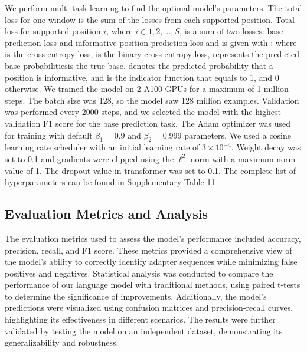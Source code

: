 \documentclass[pdflatex, sn-mathphys-num, lineno]{sn-jnl}%
\theoremstyle{thmstyleone}%
\theoremstyle{thmstyletwo}%
\theoremstyle{thmstylethree}%
\begin{document}
We perform multi-task learning to find the optimal model’s parameters.
The total loss for one window is the sum of the losses from each supported position.
Total loss for supported position  \( i \), where \( i  \in {1,2, \ldots, S} \), is a sum of two losses: base prediction loss and informative position prediction loss and is given with :
where is the cross-entropy loss,  is the binary cross-entropy loss, represents the predicted base probabilitiesis the true base.
denotes the predicted probability that a
position is informative, and is the indicator function that equals to 1, and 0 otherwise.
We trained the model on 2 A100 GPUs for a maximum of 1 million steps.
The batch size was 128, so the model saw 128 million examples.
Validation was performed every 2000 steps, and we selected the model with the highest validation F1 score for the base prediction task.
The Adam optimizer was used for training with default \( \beta_{1} = 0.9 \) and \( \beta_{2} = 0.999 \) parameters.
We used a cosine learning rate scheduler with an initial learning rate of \( 3 \times 10^{-4} \).
Weight decay was set to 0.1 and gradients were clipped using the \( \ell^{2}\)-norm with a maximum norm value of 1.
The dropout value in transformer was set to \num{0.1}.
The complete list of hyperparameters can be found in Supplementary Table 11

\subsection{Evaluation Metrics and Analysis}

The evaluation metrics used to assess the model's performance included accuracy, precision, recall, and F1 score.
These metrics provided a comprehensive view of the model's ability to correctly identify adapter sequences while minimizing false positives and negatives.
Statistical analysis was conducted to compare the performance of our language model with traditional methods, using paired t-tests to determine the significance of improvements.
Additionally, the model's predictions were visualized using confusion matrices and precision-recall curves, highlighting its effectiveness in different scenarios.
The results were further validated by testing the model on an independent dataset, demonstrating its generalizability and robustness.

\end{document}
